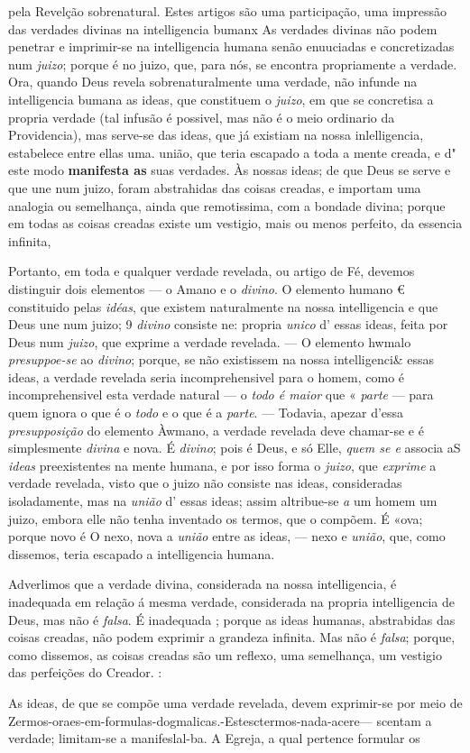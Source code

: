 pela Revelção sobrenatural. Estes artigos são uma participação, uma impressão das verdades divinas na intelligencia bumanx As verdades divinas não podem penetrar e imprimir-se na intelligencia humana senão enuuciadas e concretizadas num \emph{juizo}; porque é no juizo, que, para nós, se encontra propriamente a verdade. Ora, quando Deus revela sobrenaturalmente uma verdade, não infunde na intelligencia bumana as ideas, que constituem o \emph{juizo}, em que se concretisa a propria verdade (tal infusão é possivel, mas não é o meio ordinario da Providencia), mas serve-se das ideas, que já existiam na nossa inlelligencia, estabelece entre ellas uma. união, que teria escapado a toda a mente creada, e d" este modo \textbf{manifesta as} suas verdades. Às nossas ideas; de que Deus se serve e que une num juizo, foram abstrahidas das coisas creadas, e importam uma analogia ou semelhança, ainda que remotissima, com a bondade divina; porque em todas as coisas creadas existe um vestigio, mais ou menos perfeito, da essencia infinita,\par Portanto, em toda e qualquer verdade revelada, ou artigo de Fé, devemos distinguir dois elementos --- o Amano e o \emph{divino}. O elemento humano € constituido pelas \emph{idéas}, que existem naturalmente na nossa intelligencia e que Deus une num juizo; 9 \emph{divino} consiste ne: propria \emph{unico} d' essas ideas, feita por Deus num \emph{juizo}, que exprime a verdade revelada. --- O elemento hwmalo \emph{presuppoe-se} ao \emph{divino}; porque, se não existissem na nossa intelligenci\& essas ideas, a verdade revelada seria incomprehensivel para o homem, como é incomprehensivel esta verdade natural --- o \emph{todo é maior} que « \emph{parte} --- para quem ignora o que é o \emph{todo} e o que é a \emph{parte}. --- Todavia, apezar d'essa \emph{presupposição} do elemento Àwmano, a verdade revelada deve chamar-se e é simplesmente \emph{divina} e nova. É \emph{divino}; pois é Deus, e só Elle, \emph{quem se e} associa aS \emph{ideas} preexistentes na mente humana, e por isso forma o \emph{juizo}, que \emph{exprime} a verdade revelada, visto que o juizo não consiste nas ideas, consideradas isoladamente, mas na \emph{união} d' essas ideas; assim altribue-se \emph{a} um homem um juizo, embora elle não tenha inventado os termos, que o compõem. É «ova; porque novo é O nexo, nova a \emph{união} entre as ideas, --- nexo e \emph{união}, que, como dissemos, teria escapado a intelligencia humana.\par Adverlimos que a verdade divina, considerada na nossa intelligencia, é inadequada em relação á mesma verdade, considerada na propria intelligencia de Deus, mas não é \emph{falsa}. É inadequada ; porque as ideas humanas, abstrabidas das coisas creadas, não podem exprimir a grandeza infinita. Mas não é \emph{falsa}; porque, como dissemos, as coisas creadas são um reflexo, uma semelhança, um vestigio das perfeições do Creador. :\par As ideas, de que se compõe uma verdade revelada, devem exprimir-se por meio de Zermos-oraes-em-formulas-dogmalicas.-Estesctermos-nada-acere--- scentam a verdade; limitam-se a manifeslal-ba. A Egreja, a qual pertence formular os 